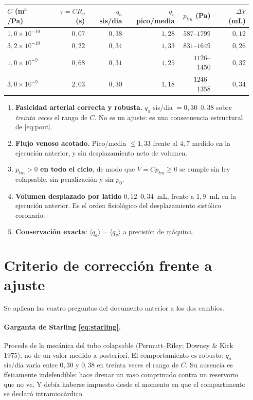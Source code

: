 \documentclass[11pt]{article}
\begin{document}
\begin{center}\small
\begin{tabular}{lrrrrr}
\toprule
$C$ (m$^3$/Pa) & $\tau=CR_v$ (s) & $q_a$ sis/dia & $q_v$ pico/media & $p_{tm}$ (Pa) & $\Delta V$ (mL)\\
\midrule
$1{,}0\times10^{-10}$ & $0{,}07$ & $0{,}38$ & $1{,}28$ & $587$--$1799$ & $0{,}12$\\
$3{,}2\times10^{-10}$ & $0{,}22$ & $0{,}34$ & $1{,}33$ & $831$--$1649$ & $0{,}26$\\
$1{,}0\times10^{-9}$  & $0{,}68$ & $0{,}31$ & $1{,}25$ & $1126$--$1450$ & $0{,}32$\\
$3{,}0\times10^{-9}$  & $2{,}03$ & $0{,}30$ & $1{,}18$ & $1246$--$1358$ & $0{,}34$\\
\bottomrule
\end{tabular}
\end{center}

\begin{enumerate}
\item \textbf{Fasicidad arterial correcta y robusta.} $q_a$ sis/dia
  $=0{,}30$--$0{,}38$ sobre \emph{treinta veces} el rango de $C$. No es un
  ajuste: es una consecuencia estructural de \eqref{eq:pout}.
\item \textbf{Flujo venoso acotado.} Pico/media $\le1{,}33$ frente al $4{,}7$
  medido en la ejecuci\'on anterior, y sin desplazamiento neto de volumen.
\item \textbf{$p_{tm}>0$ en todo el ciclo}, de modo que $V=Cp_{tm}\ge0$ se
  cumple sin ley colapsable, sin penalizaci\'on y sin $p_0$.
\item \textbf{Volumen desplazado por latido} $0{,}12$--$0{,}34$~mL, frente a
  $1{,}9$~mL en la ejecuci\'on anterior. Es el orden fisiol\'ogico del
  desplazamiento sist\'olico coronario.
\item \textbf{Conservaci\'on exacta}: $\langle q_a\rangle=\langle q_v\rangle$ a
  precisi\'on de m\'aquina.
\end{enumerate}

\section{Criterio de correcci\'on frente a ajuste}
\label{sec:crit}

Se aplican las cuatro preguntas del documento anterior a los dos cambios.

\paragraph{Garganta de Starling \eqref{eq:starling}.} Procede de la mec\'anica
del tubo colapsable (Permutt--Riley; Downey \& Kirk 1975), no de un valor
medido a posteriori. El comportamiento es robusto: $q_a$ sis/dia var\'ia entre
$0{,}30$ y $0{,}38$ en treinta veces el rango de $C$. Su ausencia es
f\'isicamente indefendible: hace drenar un vaso comprimido contra un
reservorio que no ve. Y deb\'ia haberse impuesto desde el momento en que el
compartimento se declar\'o intramioc\'ardico.
\end{document}
